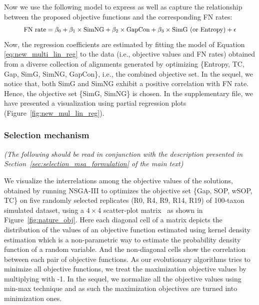 Now we use the following model to express as well as capture the relationship between the proposed objective functions and the corresponding FN rates:
\begin{equation}
\small
\begin{split}
\text{FN rate} = \beta_0 + \beta_1 \times \text{SimNG}+ \beta_2 \times \text{GapCon} + 
\beta_3 \times \text{SimG (or Entropy)} + \epsilon \label{eq:new_multi_lin_reg}
\end{split}
\end{equation}
Now, the regression coefficients are estimated by fitting the model of Equation \ref{eq:new_multi_lin_reg} to the data (i.e., objective values and FN rates) obtained from a diverse collection of alignments generated by optimizing \{Entropy, TC, Gap, SimG, SimNG, GapCon\}, i.e., the combined objective set. In the sequel, we notice that, both SimG and SimNG exhibit a positive correlation with FN rate. Hence, the objective set \{SimG, SimNG\} is chosen. In the supplementary file, we have presented a visualization using partial regression plots (Figure~\ref{fig:new_mul_lin_reg}).


\subsubsection{Selection mechanism}%
\textit{(The following should be read in conjunction with the description presented in Section~\ref{sec:selection_msa_formulation} of the main text)} 

We visualize the interrelations among the objective values of the solutions, obtained by running NSGA-III to optimizes the objective set \{Gap, SOP, wSOP, TC\} on five randomly selected replicates (R0, R4, R9, R14, R19) of 100-taxon simulated dataset, using a $ 4\times4 $ scatter-plot matrix~\cite{kalyanmoy2001multi} as shown in Figure~\ref{fig:nature_obj}. Here each diagonal cell of a matrix depicts the distribution of the values of an objective function estimated using kernel density estimation which is a non-parametric way to estimate the probability density function of a random variable. And the non-diagonal cells show the correlation between each pair of objective functions. As our evolutionary algorithms tries to minimize all objective functions, we treat the maximization objective values by multiplying with -1. In the sequel, we normalize all the objective values using min-max technique and as such the maximization objectives are turned into minimization ones.


